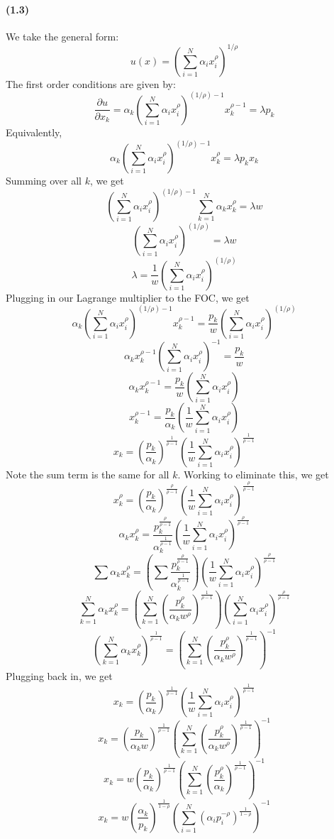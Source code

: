 \documentclass[10pt,letter]{article}
\begin{document}
\paragraph{(1.3)}
We take the general form:
\[ u(x) = \left( \sum_{i=1}^N \alpha_i x_i^\rho \right)^{1/\rho} \]
The first order conditions are given by:
\[ \frac{\partial u}{\partial x_k} = \alpha_k\left( \sum_{i=1}^N \alpha_i x_i^\rho \right)^{(1/\rho) - 1} x_k^{\rho - 1} = \lambda p_k \]
Equivalently,
\[ \alpha_k\left( \sum_{i=1}^N \alpha_i x_i^\rho \right)^{(1/\rho) - 1} x_k^{\rho} = \lambda p_k x_k \]
Summing over all $k$, we get
\[ \left( \sum_{i=1}^N \alpha_i x_i^\rho \right)^{(1/\rho) - 1} \sum_{k=1}^N \alpha_k x_k^{\rho} = \lambda w \]
\[ \left( \sum_{i=1}^N \alpha_i x_i^\rho \right)^{(1/\rho)} = \lambda w \]
\[ \lambda = \frac{1}{w}\left( \sum_{i=1}^N \alpha_i x_i^\rho \right)^{(1/\rho)} \]
Plugging in our Lagrange multiplier to the FOC, we get
\[ \alpha_k\left( \sum_{i=1}^N \alpha_i x_i^\rho \right)^{(1/\rho) - 1} x_k^{\rho - 1} = \frac{p_k}{w}\left( \sum_{i=1}^N \alpha_i x_i^\rho \right)^{(1/\rho)} \]
\[ \alpha_k x_k^{\rho - 1}\left( \sum_{i=1}^N \alpha_i x_i^\rho \right)^{- 1}  = \frac{p_k}{w} \]
\[ \alpha_k x_k^{\rho - 1}  = \frac{p_k}{w}\left( \sum_{i=1}^N \alpha_i x_i^\rho \right) \]
\[ x_k^{\rho - 1}  = \frac{p_k}{\alpha_k}\left( \frac{1}{w}\sum_{i=1}^N \alpha_i x_i^\rho \right) \]
\[ x_k = \left(\frac{p_k}{\alpha_k}\right)^{\frac{1}{\rho-1}}\left( \frac{1}{w}\sum_{i=1}^N \alpha_i x_i^\rho \right)^{\frac{1}{\rho-1}} \]
Note the sum term is the same for all $k$. Working to eliminate this, we get
\[ x_k^\rho = \left(\frac{p_k}{\alpha_k}\right)^{\frac{\rho}{\rho-1}}\left( \frac{1}{w}\sum_{i=1}^N \alpha_i x_i^\rho \right)^{\frac{\rho}{\rho-1}} \]
\[ \alpha_k x_k^\rho = \frac{p_k^{\frac{\rho}{\rho-1}}}{\alpha_k^{\frac{1}{\rho-1} }}\left( \frac{1}{w}\sum_{i=1}^N \alpha_i x_i^\rho \right)^{\frac{\rho}{\rho-1}} \]
\[ \sum \alpha_k x_k^\rho = \left(\sum \frac{p_k^{\frac{\rho}{\rho-1}}}{\alpha_k^{\frac{1}{\rho-1} }} \right)\left( \frac{1}{w}\sum_{i=1}^N \alpha_i x_i^\rho \right)^{\frac{\rho}{\rho-1}} \]
\[ \sum_{k=1}^N \alpha_k x_k^\rho =  \left(\sum_{k=1}^N \left(\frac{p_k^\rho}{\alpha_k w^\rho}\right)^{\frac{1}{\rho-1}} \right)\left(\sum_{i=1}^N \alpha_i x_i^\rho \right)^{\frac{\rho}{\rho-1}} \]
\[ \left( \sum_{k=1}^N \alpha_k x_k^\rho \right)^{\frac{1}{\rho-1}} =  \left(\sum_{k=1}^N \left(\frac{p_k^\rho}{\alpha_k w^\rho}\right)^{\frac{1}{\rho-1}} \right)^{-1} \]
Plugging back in, we get
\[ x_k = \left(\frac{p_k}{\alpha_k}\right)^{\frac{1}{\rho-1}}\left( \frac{1}{w}\sum_{i=1}^N \alpha_i x_i^\rho \right)^{\frac{1}{\rho-1}} \]
\[ x_k = \left(\frac{p_k}{\alpha_k w}\right)^{\frac{1}{\rho-1}}\left(\sum_{k=1}^N \left(\frac{p_k^\rho}{\alpha_k w^\rho}\right)^{\frac{1}{\rho-1}} \right)^{-1} \]
\[ x_k = w \left(\frac{p_k}{\alpha_k}\right)^{\frac{1}{\rho-1}}\left(\sum_{k=1}^N \left(\frac{p_k^\rho}{\alpha_k }\right)^{\frac{1}{\rho-1}} \right)^{-1} \]
\[ x_k = w \left(\frac{\alpha_k}{p_k}\right)^{\frac{1}{1-\rho}}\left(\sum_{i=1}^N \left(\alpha_i p_i^{-\rho }\right)^{\frac{1}{1-\rho}} \right)^{-1} \]
\end{document}
